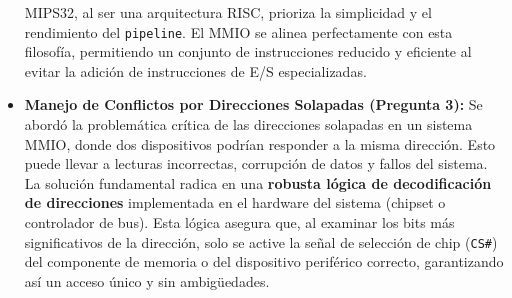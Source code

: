\documentclass[12pt, a4paper]{article}
\begin{document}
\begin{itemize}
\begin{itemize}
    \end{itemize}
    MIPS32, al ser una arquitectura RISC, prioriza la simplicidad y el rendimiento del \texttt{pipeline}. El MMIO se alinea perfectamente con esta filosofía, permitiendo un conjunto de instrucciones reducido y eficiente al evitar la adición de instrucciones de E/S especializadas.
    \item \textbf{Manejo de Conflictos por Direcciones Solapadas (Pregunta 3):} Se abordó la problemática crítica de las direcciones solapadas en un sistema MMIO, donde dos dispositivos podrían responder a la misma dirección. Esto puede llevar a lecturas incorrectas, corrupción de datos y fallos del sistema. La solución fundamental radica en una \textbf{robusta lógica de decodificación de direcciones} implementada en el hardware del sistema (chipset o controlador de bus). Esta lógica asegura que, al examinar los bits más significativos de la dirección, solo se active la señal de selección de chip (\texttt{CS\#}) del componente de memoria o del dispositivo periférico correcto, garantizando así un acceso único y sin ambigüedades.
\end{itemize}
\end{document}
